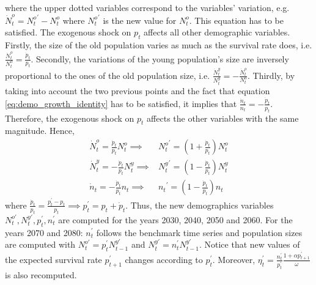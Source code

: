 where the upper dotted variables correspond to the variables' variation, e.g. $\dot{N}_t^o = {N_t^o}^\prime - N_t^o$ where ${N_t^o}^\prime$ is the new value for $N_t^o$. This equation has to be satisfied. The exogenous shock on $p_t$ affects all other demographic variables. Firstly, the size of the old population varies as much as the survival rate does, i.e. $\frac{\dot{N}_t^o}{N_t^o} = \frac{\dot{p}_t}{p_t}$. Secondly, the variations of the young population's size are inversely proportional to the ones of the old population size, i.e. $\frac{\dot{N}_t^y}{N_t^y} = -\frac{\dot{N}_t^o}{N_t^o}$. Thirdly, by taking into account the two previous points and the fact that equation \eqref{eq:demo_growth_identity} has to be satisfied, it implies that $\frac{\dot{n}_t}{n_t} = -\frac{\dot{p}_t}{p_t}$. Therefore, the exogenous shock on $p_t$ affects the other variables with the same magnitude.
Hence,
\begin{align*}
	\dot{N}^o_t = \frac{\dot{p}_t}{p_t} N^o_t \implies& {N^o_t}^\prime = \left(1+\frac{\dot{p}_t}{p_t}\right) N^o_t \\
	\dot{N}^y_t = -\frac{\dot{p}_t}{p_t} N^y_t \implies& {N^y_t}^\prime = \left(1-\frac{\dot{p}_t}{p_t}\right) N^y_t \\
	\dot{n}_t = -\frac{\dot{p}_t}{p_t} n_t \implies& {n_t}^\prime = \left(1-\frac{\dot{p}_t}{p_t}\right) n_t
\end{align*}
where $\frac{\dot{p}_t}{p_t} = \frac{p^\prime_t - p_t}{p_t} \implies p^\prime_t = p_t + \dot{p}_t$. Thus, the new demographics variables $N^{o\prime}_t, N^{y\prime}_t, p^\prime_t, n^\prime_t$ are computed for the years 2030, 2040, 2050 and 2060. For the years 2070 and 2080: $n^\prime_t$ follows the benchmark time series and population sizes are computed with $N^{o\prime}_t = p^\prime_t {N^{y\prime}_{t-1}}$ and $N^{y\prime}_t = n^\prime_t N^{y\prime}_{t-1}$. Notice that new values of the expected survival rate $p^\prime_{t+1}$ changes according to $p^\prime_t$. Moreover, $\eta^\prime_t = \frac{n^\prime_t}{p^\prime_t}\frac{1+\alpha p^\prime_{t+1}}{\omega}$ is also recomputed.

